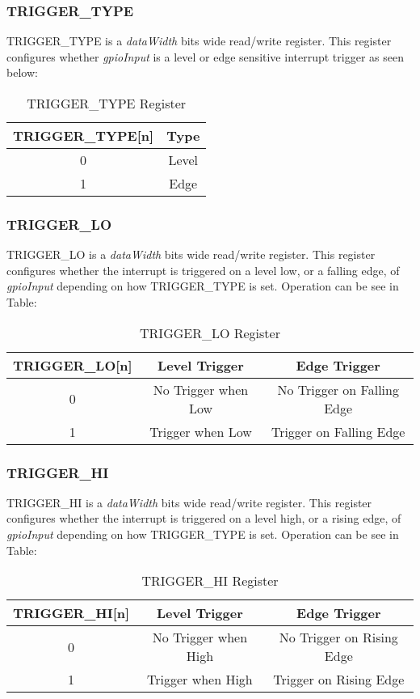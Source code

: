 \subsubsection{TRIGGER\_TYPE}
TRIGGER\_TYPE is a \textit{dataWidth} bits wide read/write register. This register configures whether \textit{gpioInput} is a level or edge sensitive
interrupt trigger as seen below:
\begin{table}[h]
  \centering
  \begin{tabular}{|c|c|}
      \hline
      \textbf{TRIGGER\_TYPE[n]} & \textbf{Type} \\ \hline
      0 & Level \\ \hline
      1 & Edge \\ \hline
  \end{tabular}
  \caption{TRIGGER\_TYPE Register}
\end{table}

\newpage

\subsubsection{TRIGGER\_LO}
TRIGGER\_LO is a \textit{dataWidth} bits wide read/write register. This register configures whether the interrupt is triggered on a level low, or a falling edge, 
of \textit{gpioInput} depending on how TRIGGER\_TYPE is set. Operation can be see in Table:
\begin{table}[h]
  \centering
  \begin{tabular}{|c|c|c|}
      \hline
      \textbf{TRIGGER\_LO[n]} & \textbf{Level Trigger} & \textbf{Edge Trigger} \\ \hline
      0 & No Trigger when Low & No Trigger on Falling Edge\\ \hline
      1 & Trigger when Low & Trigger on Falling Edge\\ \hline
  \end{tabular}
  \caption{TRIGGER\_LO Register}
\end{table}

\subsubsection{TRIGGER\_HI}
TRIGGER\_HI is a \textit{dataWidth} bits wide read/write register. This register configures whether the interrupt is triggered on a level high, or a rising edge, 
of \textit{gpioInput} depending on how TRIGGER\_TYPE is set. Operation can be see in Table:
\begin{table}[h]
  \centering
  \begin{tabular}{|c|c|c|}
      \hline
      \textbf{TRIGGER\_HI[n]} & \textbf{Level Trigger} & \textbf{Edge Trigger} \\ \hline
      0 & No Trigger when High & No Trigger on Rising Edge\\ \hline
      1 & Trigger when High & Trigger on Rising Edge\\ \hline
  \end{tabular}
  \caption{TRIGGER\_HI Register}
\end{table}


